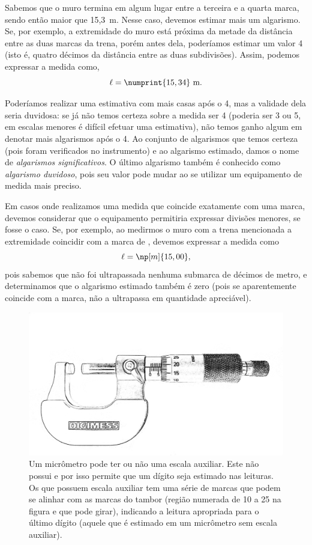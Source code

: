 \noindent{}Sabemos que o muro termina em algum lugar entre a terceira e a quarta marca, sendo então maior que 15,3~m. Nesse caso, devemos estimar mais um algarismo. Se, por exemplo, a extremidade do muro está próxima da metade da distância entre as duas marcas da trena, porém antes dela, poderíamos estimar um valor 4 (isto é, quatro décimos da distância entre as duas subdivisões). Assim, podemos expressar a medida como,
\begin{equation}
     \ell = \numprint{15,34}\textrm{~m}.
\end{equation}

Poderíamos realizar uma estimativa com mais casas após o 4, mas a validade dela seria duvidosa: se já não temos certeza sobre a medida ser 4 (poderia ser 3 ou 5, em escalas menores é difícil efetuar uma estimativa), não temos ganho algum em denotar mais algarismos após o 4. Ao conjunto de algarismos que temos certeza (pois foram verificados no instrumento) e ao algarismo estimado, damos o nome de \emph{algarismos significativos}. O último algarismo também é conhecido como \emph{algarismo duvidoso}, pois seu valor pode mudar ao se utilizar um equipamento de medida mais preciso.

Em casos onde realizamos uma medida que coincide exatamente com uma marca, devemos considerar que o equipamento permitiria expressar divisões menores, se fosse o caso. Se, por exemplo, ao medirmos o muro com a trena mencionada a extremidade coincidir com a marca de , devemos expressar a medida como
\begin{equation}
	\ell = \np[m]{15,00},
\end{equation}
%
pois sabemos que não foi ultrapassada nenhuma submarca de décimos de metro, e determinamos que o algarismo estimado também é zero (pois se aparentemente coincide com a marca, não a ultrapassa em quantidade apreciável).

\begin{figure}
	\centering
	\includegraphics[width=\textwidth]{Ilustrations/Micrometro_sem_obj.png}
	\caption{Um micrômetro pode ter ou não uma escala auxiliar. Este não possui e por isso permite que um dígito seja estimado nas leituras. Os que possuem escala auxiliar tem uma série de marcas que podem se alinhar com as marcas do tambor (região numerada de 10 a 25 na figura e que pode girar), indicando a leitura apropriada para o último dígito (aquele que é estimado em um micrômetro sem escala auxiliar).}
\end{figure}

